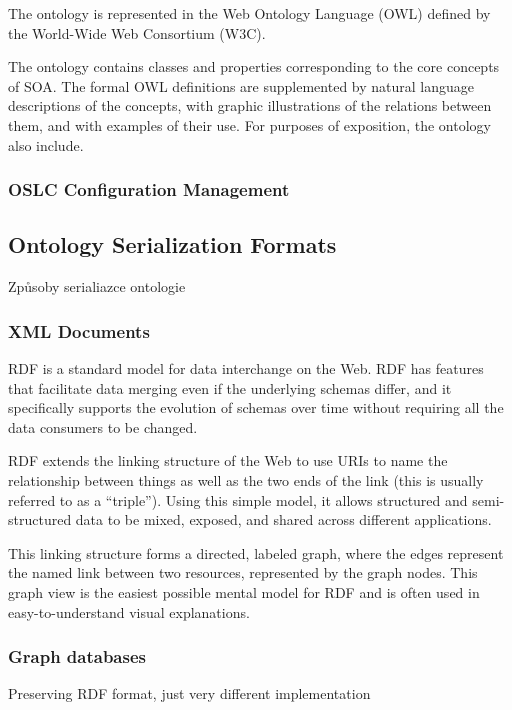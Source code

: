 The ontology is represented in the Web Ontology Language (OWL) defined by the World-Wide Web Consortium (W3C). 

The ontology contains classes and properties corresponding to the core concepts of SOA. The formal OWL definitions are supplemented by natural language descriptions of the concepts, with graphic illustrations of the relations between them, and with examples of their use. For purposes of exposition, the ontology also include.

\subsubsection{OSLC Configuration Management}


\subsection{Ontology Serialization Formats}

Způsoby serialiazce ontologie

\subsubsection{XML Documents}

RDF is a standard model for data interchange on the Web. RDF has features that facilitate data merging even if the underlying schemas differ, and it specifically supports the evolution of schemas over time without requiring all the data consumers to be changed.

RDF extends the linking structure of the Web to use URIs to name the relationship between things as well as the two ends of the link (this is usually referred to as a “triple”). Using this simple model, it allows structured and semi-structured data to be mixed, exposed, and shared across different applications. 

This linking structure forms a directed, labeled graph, where the edges represent the named link between two resources, represented by the graph nodes. This graph view is the easiest possible mental model for RDF and is often used in easy-to-understand visual explanations. 


\subsubsection{Graph databases}

Preserving RDF format, just very different implementation 

